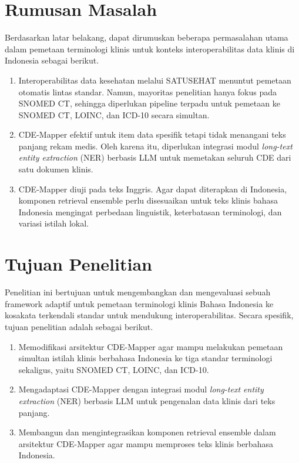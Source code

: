\section{Rumusan Masalah}

Berdasarkan latar belakang, dapat dirumuskan beberapa permasalahan utama dalam pemetaan terminologi klinis untuk konteks interoperabilitas data klinis di Indonesia sebagai berikut.
\begin{enumerate}
    \item Interoperabilitas data kesehatan melalui SATUSEHAT menuntut pemetaan otomatis lintas standar. Namun, mayoritas penelitian hanya fokus pada SNOMED CT, sehingga diperlukan pipeline terpadu untuk pemetaan ke SNOMED CT, LOINC, dan ICD-10 secara simultan.
    \item CDE-Mapper \citep{gilani_cde-mapper_2025} efektif untuk item data spesifik tetapi tidak menangani teks panjang rekam medis. Oleh karena itu, diperlukan integrasi modul \textit{long-text entity extraction} (NER) berbasis LLM untuk memetakan seluruh CDE dari satu dokumen klinis.
    \item CDE-Mapper diuji pada teks Inggris. Agar dapat diterapkan di Indonesia, komponen retrieval ensemble perlu disesuaikan untuk teks klinis bahasa Indonesia mengingat perbedaan linguistik, keterbatasan terminologi, dan variasi istilah lokal.
\end{enumerate}

\section{Tujuan Penelitian}

Penelitian ini bertujuan untuk mengembangkan dan mengevaluasi sebuah framework adaptif untuk pemetaan terminologi klinis Bahasa Indonesia ke kosakata terkendali standar untuk mendukung interoperabilitas. Secara spesifik, tujuan penelitian adalah sebagai berikut.
\begin{enumerate}
    \item Memodifikasi arsitektur CDE-Mapper agar mampu melakukan pemetaan simultan istilah klinis berbahasa Indonesia ke tiga standar terminologi sekaligus, yaitu SNOMED CT, LOINC, dan ICD-10.
    \item Mengadaptasi CDE-Mapper dengan integrasi modul \textit{long-text entity extraction} (NER) berbasis LLM untuk pengenalan data klinis dari teks panjang.
    \item Membangun dan mengintegrasikan komponen retrieval ensemble dalam arsitektur CDE-Mapper agar mampu memproses teks klinis berbahasa Indonesia.
\end{enumerate}

